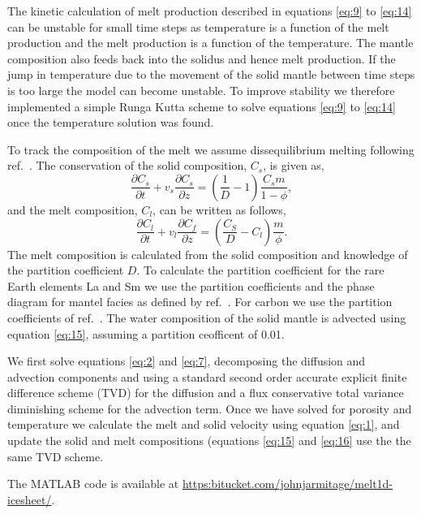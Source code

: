 \documentclass[a4paper,11pt,onecolumn]{article}
\begin{document}
The kinetic calculation of melt production described in equations \ref{eq:9} to \ref{eq:14} can be unstable for small time steps as temperature is a function of the melt production and the melt production is a function of the temperature. The mantle composition also feeds back into the solidus and hence melt production. If the jump in temperature due to the movement of the solid mantle between time steps is too large the model can become unstable. To improve stability we therefore implemented a simple Runga Kutta scheme to solve equations \ref{eq:9} to \ref{eq:14} once the temperature solution was found.

To track the composition of the melt we assume dissequilibrium melting following ref.~\cite{spiegelman-1996}. The conservation of the solid composition, $C_{s}$, is given as,
\begin{equation}
\frac{\partial C_{s}}{\partial t} + v_{s}\frac{\partial C_{s}}{\partial z} = \left(\frac{1}{D} - 1\right) \frac{C_{s}m}{1-\phi},
\label{eq:15}
\end{equation}
and the melt composition, $C_{l}$, can be written as follows,
\begin{equation}
\frac{\partial C_{l}}{\partial t} + v_{l}\frac{\partial C_{f}}{\partial z} = \left(\frac{C_{S}}{D} - C_{l}\right)\frac{m}{\phi}.
\label{eq:16}
\end{equation}
The melt composition is calculated from the solid composition and knowledge of the partition coefficient $D$. To calculate the partition coefficient for the rare Earth elements La and Sm we use the partition coefficients and the phase diagram for mantel facies as defined by ref.~\cite{gibson-2010}. For carbon we use the partition coefficients of ref.~\cite{rosenthal-etal-2015}. The water composition of the solid mantle is advected using equation \ref{eq:15}, assuming a partition ceofficent of 0.01.

We first solve equations \ref{eq:2} and \ref{eq:7}, decomposing the diffusion and advection components and using a standard second order accurate explicit finite difference scheme (TVD) for the diffusion and a flux conservative total variance diminishing scheme for the advection term. Once we have solved for porosity and temperature we calculate the melt and solid velocity using equation \ref{eq:1}, and update the solid and melt compositions (equations \ref{eq:15} and \ref{eq:16} use the the same TVD scheme.

The MATLAB code is available at \url{https:bitucket.com/johnjarmitage/melt1d-icesheet/}.
\end{document}
